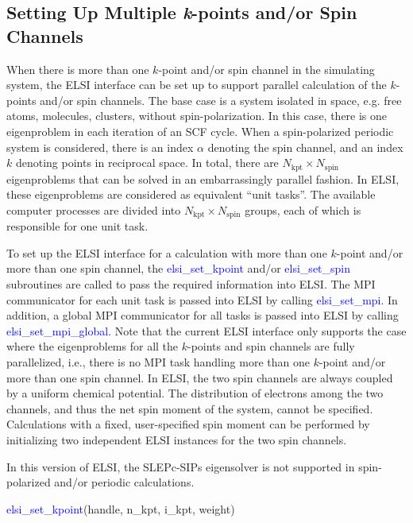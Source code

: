 \documentclass{report}
\newcommand{\tcb}[1]{\textcolor{blue}{#1}}
\begin{document}
\subsection{Setting Up Multiple \textit{k}-points and/or Spin Channels}
\label{subsec:setup_kpt}
When there is more than one $k$-point and/or spin channel in the simulating system, the ELSI interface can be set up to support parallel calculation of the $k$-points and/or spin channels. The base case is a system isolated in space, e.g. free atoms, molecules, clusters, without spin-polarization. In this case, there is one eigenproblem in each iteration of an SCF cycle. When a spin-polarized periodic system is considered, there is an index $\alpha$ denoting the spin channel, and an index $k$ denoting points in reciprocal space. In total, there are $N_\text{kpt} \times N_\text{spin}$ eigenproblems that can be solved in an embarrassingly parallel fashion. In ELSI, these eigenproblems are considered as equivalent ``unit tasks''. The available computer processes are divided into $N_\text{kpt} \times N_\text{spin}$ groups, each of which is responsible for one unit task.

To set up the ELSI interface for a calculation with more than one $k$-point and/or more than one spin channel, the \tcb{elsi\_set\_kpoint} and/or \tcb{elsi\_set\_spin} subroutines are called to pass the required information into ELSI. The MPI communicator for each unit task is passed into ELSI by calling \tcb{elsi\_set\_mpi}. In addition, a global MPI communicator for all tasks is passed into ELSI by calling \tcb{elsi\_set\_mpi\_global}. Note that the current ELSI interface only supports the case where the eigenproblems for all the $k$-points and spin channels are fully parallelized, i.e., there is no MPI task handling more than one $k$-point and/or more than one spin channel. In ELSI, the two spin channels are always coupled by a uniform chemical potential. The distribution of electrons among the two channels, and thus the net spin moment of the system, cannot be specified. Calculations with a fixed, user-specified spin moment can be performed by initializing two independent ELSI instances for the two spin channels.

In this version of ELSI, the SLEPc-SIPs eigensolver is not supported in spin-polarized and/or periodic calculations.
\begin{labeling}{\hspace{6cm}}
\item [\hspace{0.3cm} \tcb{elsi\_set\_kpoint}(handle, n\_kpt, i\_kpt, weight)]
\end{labeling}
\end{document}
